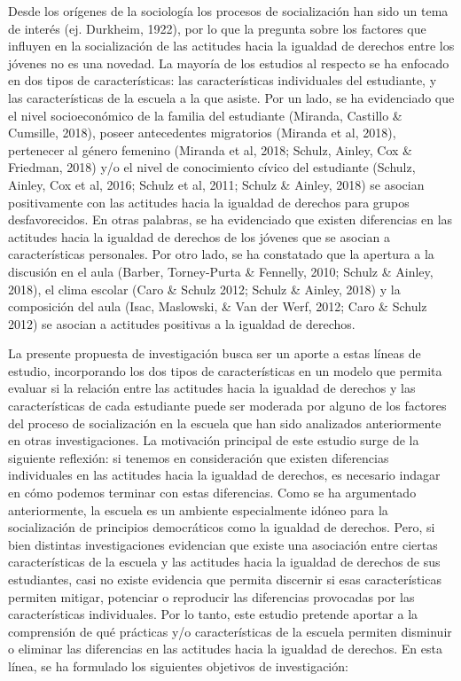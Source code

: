 \documentclass[12pt,twoside]{templates/facsothesis}
\begin{document}
Desde los orígenes de la sociología los procesos de socialización han sido un tema de interés (ej. Durkheim, 1922), por lo que la pregunta sobre los factores que influyen en la socialización de las actitudes hacia la igualdad de derechos entre los jóvenes no es una novedad. La mayoría de los estudios al respecto se ha enfocado en dos tipos de características: las características individuales del estudiante, y las características de la escuela a la que asiste. Por un lado, se ha evidenciado que el nivel socioeconómico de la familia del estudiante (Miranda, Castillo \& Cumsille, 2018), poseer antecedentes migratorios (Miranda et al, 2018), pertenecer al género femenino (Miranda et al, 2018; Schulz, Ainley, Cox \& Friedman, 2018) y/o el nivel de conocimiento cívico del estudiante (Schulz, Ainley, Cox et al, 2016; Schulz et al, 2011; Schulz \& Ainley, 2018) se asocian positivamente con las actitudes hacia la igualdad de derechos para grupos desfavorecidos. En otras palabras, se ha evidenciado que existen diferencias en las actitudes hacia la igualdad de derechos de los jóvenes que se asocian a características personales. Por otro lado, se ha constatado que la apertura a la discusión en el aula (Barber, Torney-Purta \& Fennelly, 2010; Schulz \& Ainley, 2018), el clima escolar (Caro \& Schulz 2012; Schulz \& Ainley, 2018) y la composición del aula (Isac, Maslowski, \& Van der Werf, 2012; Caro \& Schulz 2012) se asocian a actitudes positivas a la igualdad de derechos.

La presente propuesta de investigación busca ser un aporte a estas líneas de estudio, incorporando los dos tipos de características en un modelo que permita evaluar si la relación entre las actitudes hacia la igualdad de derechos y las características de cada estudiante puede ser moderada por alguno de los factores del proceso de socialización en la escuela que han sido analizados anteriormente en otras investigaciones. La motivación principal de este estudio surge de la siguiente reflexión: si tenemos en consideración que existen diferencias individuales en las actitudes hacia la igualdad de derechos, es necesario indagar en cómo podemos terminar con estas diferencias. Como se ha argumentado anteriormente, la escuela es un ambiente especialmente idóneo para la socialización de principios democráticos como la igualdad de derechos. Pero, si bien distintas investigaciones evidencian que existe una asociación entre ciertas características de la escuela y las actitudes hacia la igualdad de derechos de sus estudiantes, casi no existe evidencia que permita discernir si esas características permiten mitigar, potenciar o reproducir las diferencias provocadas por las características individuales. Por lo tanto, este estudio pretende aportar a la comprensión de qué prácticas y/o características de la escuela permiten disminuir o eliminar las diferencias en las actitudes hacia la igualdad de derechos. En esta línea, se ha formulado los siguientes objetivos de investigación:
\end{document}
